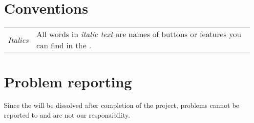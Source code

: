 \section{Conventions}
\begin{tabularx}{\textwidth}{l X}
\emph{Italics} & All words in \emph{italic text} are names of buttons or features you can find in the \applicationname{}.\\
\end{tabularx}

\section{Problem reporting}
Since the \projectauthor{} will be dissolved after completion of the \projectname{} project, problems cannot be reported to \projectauthor{} and are not our responsibility.


